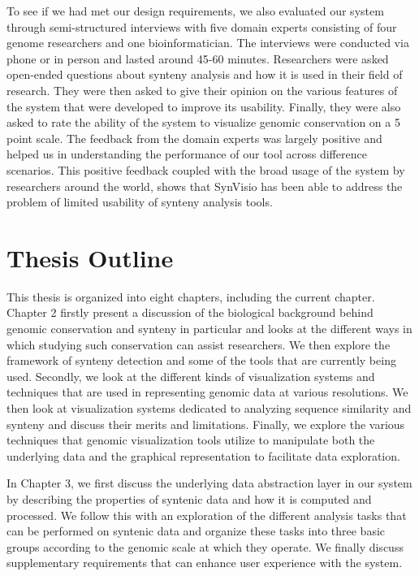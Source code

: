 To see if we had met our design requirements, we also evaluated our system through semi-structured interviews with five domain experts consisting of four genome researchers and one bioinformatician. The interviews were conducted via phone or in person and lasted around 45-60 minutes. Researchers were asked open-ended questions about synteny analysis and how it is used in their field of research. They were then asked to give their opinion on the various features of the system that were developed to improve its usability. Finally, they were also asked to rate the ability of the system to visualize genomic conservation on a 5 point scale. The feedback from the domain experts was largely positive and helped us in understanding the performance of our tool across difference scenarios. This positive feedback coupled with the broad usage of the system by researchers around the world, shows that SynVisio has been able to address the problem of limited usability of synteny analysis tools.

\section{Thesis Outline}

This thesis is organized into eight chapters, including the current chapter. Chapter 2 firstly present a discussion of the biological background behind genomic conservation and synteny in particular and looks at the different ways in which studying such conservation can assist researchers. We then explore the framework of synteny detection and some of the tools that are currently being used. Secondly, we look at the different kinds of visualization systems and techniques that are used in representing genomic data at various resolutions. We then look at visualization systems dedicated to analyzing sequence similarity and synteny and discuss their merits and limitations. Finally, we explore the various techniques that genomic visualization tools utilize to manipulate both the underlying data and the graphical representation to facilitate data exploration.

In Chapter 3, we first discuss the underlying data abstraction layer in our system by describing the properties of syntenic data and how it is computed and processed. We follow this with an exploration of the different analysis tasks that can be performed on syntenic data and organize these tasks into three basic groups according to the genomic scale at which they operate. We finally discuss supplementary requirements that can enhance user experience with the system.

